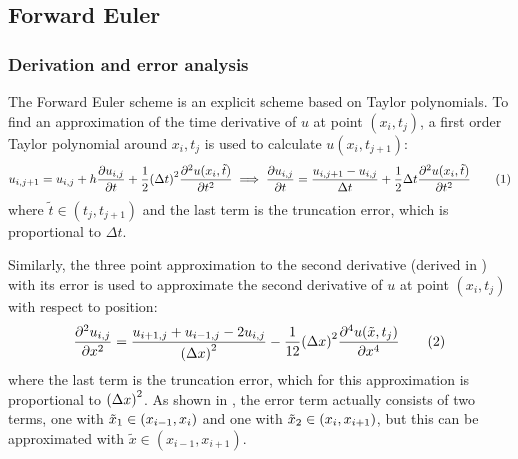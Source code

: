 \documentclass[12pt,english,a4paper]{article}
\newcommand{\eqtag}[1]{\refstepcounter{equation}\tag{\theequation}\label{#1}}
\begin{document}
\subsection{Forward Euler}

\subsubsection{Derivation and error analysis}\label{sec:ForwardEulerDerivation}
The Forward Euler scheme is an explicit scheme based on Taylor polynomials. To find an approximation of the time derivative of \(u\) at point \((x_i,t_j)\), a first order Taylor polynomial around \(x_i,t_j\) is used to calculate \(u(x_i,t_{j+1})\):
\[
    u_{i,j+1} = u_{i,j} + h\pdv{u_{i,j}}{t} + \frac{1}{2}\qty(\Delta t)^2\pdv[2]{u(x_i,\tilde{t})}{t}
    \implies \pdv{u_{i,j}}{t} = \frac{u_{i,j+1}-u_{i,j}}{\Delta t} + \frac{1}{2}\Delta t\pdv[2]{u(x_i,\tilde{t})}{t}\eqtag{asymmnewton}
\]
where \(\tilde{t}\in(t_j,t_{j+1})\) and the last term is the truncation error, which is proportional to \(\Delta t\).

Similarly, the three point approximation to the second derivative (derived in \autocite{oblig1}) with its error is used to approximate the second derivative of \(u\) at point \((x_i,t_j)\) with respect to position:
\[
    \pdv[2]{u_{i,j}}{x} = \frac{u_{i+1,j} + u_{i-1,j} - 2u_{i,j}}{\qty(\Delta x)^2} - \frac{1}{12}\qty(\Delta x)^2\pdv[4]{u(\tilde{x},t_j)}{x}\eqtag{andrederivert}
\]
where the last term is the truncation error, which for this approximation is proportional to \(\qty(\Delta x)^2\). As shown in \autocite{oblig1}, the error term actually consists of two terms, one with \(\tilde{x}_1\in\qty(x_{i-1},x_i)\) and one with \(\tilde{x}_2\in\qty(x_i,x_{i+1})\), but this can be approximated with \(\tilde{x}\in(x_{i-1},x_{i+1})\).
\end{document}

